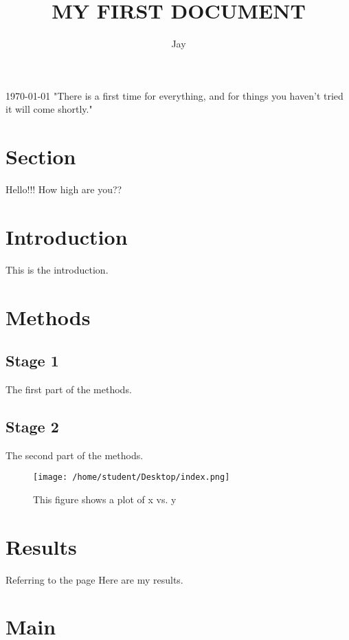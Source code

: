 \documentclass{article}
\begin{document}
\title{MY FIRST DOCUMENT}
\today
 "There is a first time for everything, and for things you haven't tried it will come shortly."
\author{Jay}
\maketitle

\tableofcontents
\newpage

\section{Section}
\label{first}
Hello!!! How high are you??

\section{Introduction}
This is the introduction.
\section{Methods}
\subsection{Stage 1}
The first part of the methods.
\subsection{Stage 2}
The second part of the methods.
\begin{figure}[h] %
	\centering
	\texttt{[image: /home/student/Desktop/index.png]}
	\caption{This figure shows a plot of x vs. y}
	\label{Cross-reference_key}
\end{figure}

\section{Results}
Referring to the page 
\pageref{first}
Here are my results.

\section{Main}
\end{document}
